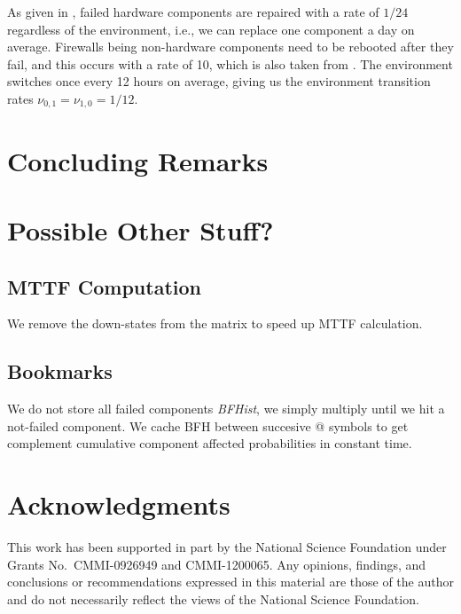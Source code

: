 \documentclass[12pt]{article}
\newcommand{\varName}[1]{\textrm{\it#1}}
\begin{document}
As given in \cite{Godd:2001}, failed hardware components are repaired with a
rate of $1 / 24$ regardless of the environment, i.e., we can replace one component
a day on average. Firewalls being non-hardware components need to be rebooted
after they fail, and this occurs with a rate of 10, which is also taken from
\cite{Godd:2001}. The environment switches once every 12 hours on average,
giving us the environment transition rates $\nu_{0, 1} = \nu_{1, 0} = 1 / 12$.




\section{Concluding Remarks}
\label{sec:conc}


\section{Possible Other Stuff?}
\subsection{MTTF Computation}
We remove the down-states from the matrix to speed up MTTF calculation.

\subsection{Bookmarks}
We do not store all failed components \varName{BFHist}, we simply multiply
until we hit a not-failed component. We cache BFH between succesive @  symbols
to get complement cumulative component affected probabilities in constant
time.


\section*{Acknowledgments}

This work has been supported
in part by
the National Science Foundation under
Grants No.\
CMMI-0926949
and CMMI-1200065.
Any opinions, findings, and conclusions or recommendations
expressed in this material are those of the author and
do not necessarily reflect the views of the National
Science Foundation.




\end{document}
